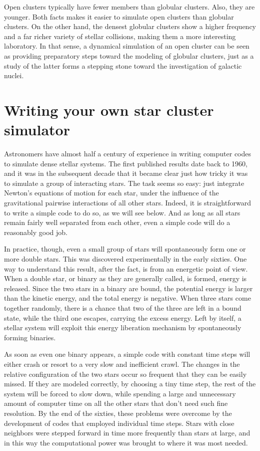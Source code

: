 Open clusters typically have fewer members than globular clusters.
Also, they are younger.  Both facts makes it easier to simulate open
clusters than globular clusters.  On the other hand, the densest
globular clusters show a higher frequency and a far richer variety of
stellar collisions, making them a more interesting laboratory.  In
that sense, a dynamical simulation of an open cluster can be seen as
providing preparatory steps toward the modeling of globular clusters,
just as a study of the latter forms a stepping stone toward the
investigation of galactic nuclei.

\section{Writing your own star cluster simulator}

Astronomers have almost half a century of experience in writing
computer codes to simulate dense stellar systems.  The first published
results date back to 1960, and it was in the subsequent decade that it
became clear just how tricky it was to simulate a group of interacting
stars.  The task seems so easy: just integrate Newton's equations of
motion for each star, under the influence of the gravitational pairwise
interactions of all other stars.  Indeed, it is straightforward to
write a simple code to do so, as we will see below.  And as long as
all stars remain fairly well separated from each other, even a simple
code will do a reasonably good job.

In practice, though, even a small group of stars will spontaneously
form one or more double stars.  This was discovered experimentally in
the early sixties.  One way to understand this result, after the fact,
is from an energetic point of view.  When a double star, or binary as they
are generally called, is formed, energy is released.  Since the two stars
in a binary are bound, the potential energy is larger than the kinetic
energy, and the total energy is negative.  When three stars come together
randomly, there is a chance that two of the three are left in a bound
state, while the third one escapes, carrying the excess energy.  Left
by itself, a stellar system will exploit this energy liberation
mechanism by spontaneously forming binaries.

As soon as even one binary appears, a simple code with constant time
steps will either crash or resort to a very slow and inefficient crawl.
The changes in the relative configuration of the two stars occur so
frequent that they can be easily missed.  If they are modeled correctly,
by choosing a tiny time step, the rest of the system will be forced to
slow down, while spending a large and unnecessary amount of computer
time on all the other stars that don't need such fine resolution.  By
the end of the sixties, these problems were overcome by the development
of codes that employed individual time steps.  Stars with close
neighbors were stepped forward in time more frequently than stars at
large, and in this way the computational power was brought to where it
was most needed.

